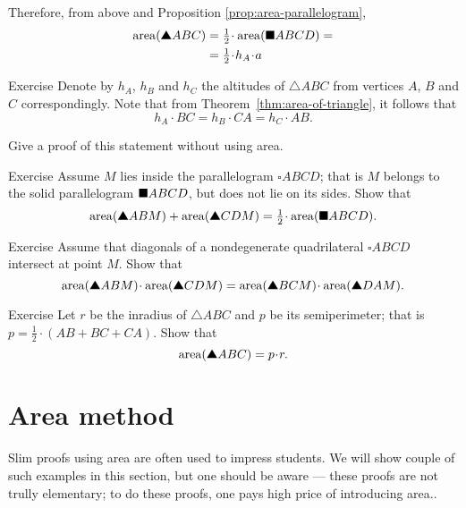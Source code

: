 Therefore, from above and Proposition \ref{prop:area-parallelogram},
\begin{align*}
\area(\solidtriangle ABC)
&=\tfrac12\cdot\area(\solidsquare ABCD)=
\\
&=\tfrac12\cdot h_A\cdot a
\end{align*}
\qedsf

\begin{thm}{Exercise}\label{ex:three-trig}
Denote by $h_A$, $h_B$ and $h_C$
the altitudes of $\triangle ABC$ from vertices $A$, $B$ and $C$ correspondingly.
Note that from Theorem~\ref{thm:area-of-triangle},
it follows that
\[h_A\cdot BC=h_B\cdot CA=h_C\cdot AB.\]

Give a proof of this statement without using area.
\end{thm}

\begin{thm}{Exercise}\label{ex:half-parallelogram}
Assume $M$ lies inside the parallelogram $\square ABCD$;
that is $M$ belongs to the solid parallelogram $\blacksquare ABCD$, but does not lie on its sides.
Show that
\[\area(\solidtriangle ABM)+\area(\solidtriangle CDM)
=\tfrac12\cdot \area(\solidsquare ABCD).\]
\end{thm}


\begin{thm}{Exercise}\label{ex:area-diag}
Assume that diagonals 
of a nondegenerate quadrilateral $\square ABCD$ 
intersect at point $M$.
Show that 
\[\area(\solidtriangle ABM)\cdot\area(\solidtriangle CDM)
=
\area(\solidtriangle BCM)\cdot\area(\solidtriangle DAM).\]
 
\end{thm}

\begin{thm}{Exercise}\label{ex:area-inradius}
Let $r$ be the inradius of $\triangle ABC$
and $p$ be its semiperimeter; 
that is $p=\tfrac12\cdot(AB+BC+CA)$.
Show that
\[\area(\solidtriangle ABC)=p\cdot r.\]

\end{thm}




\section*{Area method}

Slim proofs using area 
are often used to impress students.
We will show couple of such examples in this section,
but one should be aware --- these proofs are not trully elementary; to do these proofs, 
one pays high price of introducing area..

